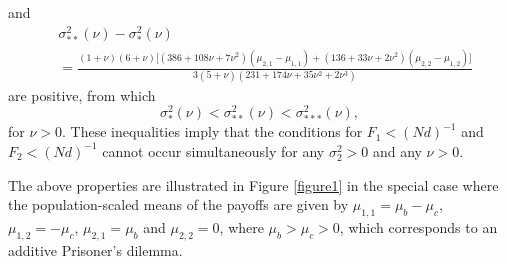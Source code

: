 \documentclass[11pt]{article}
\begin{document}
and
\begin{align}
&\sigma^2_{**}(\nu)-\sigma^2_{*}(\nu)\nonumber\\
&=\frac{
(1+\nu) (6+\nu)\Big[(386 + 108\nu + 7\nu^2)(\mu_{2,1}-\mu_{1,1})
+(136 + 33 \nu + 2 \nu^2)(\mu_{2,2}-\mu_{1,2})\Big]
}{3(5+\nu) (231+174\nu+35\nu^2+2\nu^3)}
\end{align}
are positive,
from which
\begin{equation}
\sigma^2_{*}(\nu)<\sigma^2_{**}(\nu)<\sigma^2_{***}(\nu),
\end{equation}
for $\nu>0$. These inequalities imply that the conditions for $F_1<(Nd)^{-1}$ and $F_2<(Nd)^{-1}$ cannot occur simultaneously for any $\sigma_{2}^2>0$ and any $\nu>0$.

The above properties are illustrated in Figure \ref{figure1} in the special case  where 
the population-scaled means of the payoffs are given by $\mu_{1,1}=\mu_b-\mu_c$, $\mu_{1,2}=-\mu_c$, $\mu_{2,1}=\mu_b$ and $\mu_{2,2}=0$, where $\mu_b>\mu_c>0$, which corresponds to an additive Prisoner's dilemma. 

\end{document}
